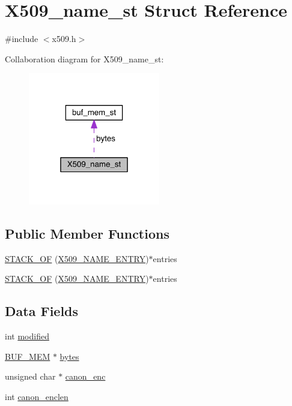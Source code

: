 \hypertarget{struct_x509__name__st}{}\section{X509\+\_\+name\+\_\+st Struct Reference}
\label{struct_x509__name__st}


{\ttfamily \#include $<$x509.\+h$>$}



Collaboration diagram for X509\+\_\+name\+\_\+st\+:\nopagebreak
\begin{figure}[H]
\begin{center}
\leavevmode
\includegraphics[width=163pt]{struct_x509__name__st__coll__graph}
\end{center}
\end{figure}
\subsection*{Public Member Functions}
\begin{DoxyCompactItemize}
\item 
\hyperlink{struct_x509__name__st_afe1c1381f4dbfad9f8318440835a1d64}{S\+T\+A\+C\+K\+\_\+\+OF} (\hyperlink{crypto_2x509_2x509_8h_af3ca6ec6d07932d262daab57dab9cdd0}{X509\+\_\+\+N\+A\+M\+E\+\_\+\+E\+N\+T\+RY})$\ast$entries
\item 
\hyperlink{struct_x509__name__st_afe1c1381f4dbfad9f8318440835a1d64}{S\+T\+A\+C\+K\+\_\+\+OF} (\hyperlink{crypto_2x509_2x509_8h_af3ca6ec6d07932d262daab57dab9cdd0}{X509\+\_\+\+N\+A\+M\+E\+\_\+\+E\+N\+T\+RY})$\ast$entries
\end{DoxyCompactItemize}
\subsection*{Data Fields}
\begin{DoxyCompactItemize}
\item 
int \hyperlink{struct_x509__name__st_a0826efcc81bba9d934e1207721a46ddf}{modified}
\item 
\hyperlink{crypto_2ossl__typ_8h_aaea4d745bf2689d2009791186616bb3c}{B\+U\+F\+\_\+\+M\+EM} $\ast$ \hyperlink{struct_x509__name__st_acc4709a60bb92b3f6867215f6345450e}{bytes}
\item 
unsigned char $\ast$ \hyperlink{struct_x509__name__st_ab98aa42900a7797413b946429f0ca0f9}{canon\+\_\+enc}
\item 
int \hyperlink{struct_x509__name__st_ab0c75717ca29f7c83cbb1cf10566e8b2}{canon\+\_\+enclen}
\end{DoxyCompactItemize}


